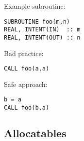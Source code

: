 \begin{itemize}
Example subroutine:
\begin{verbatim}
SUBROUTINE foo(m,n)
REAL, INTENT(IN)  :: m
REAL, INTENT(OUT) :: n
\end{verbatim}

Bad practice:
\begin{verbatim}
CALL foo(a,a)
\end{verbatim}

Safe approach:
\begin{verbatim}
b = a
CALL foo(b,a)
\end{verbatim}
\end{itemize}


\subsection{Allocatables}\label{sec:allocate}
